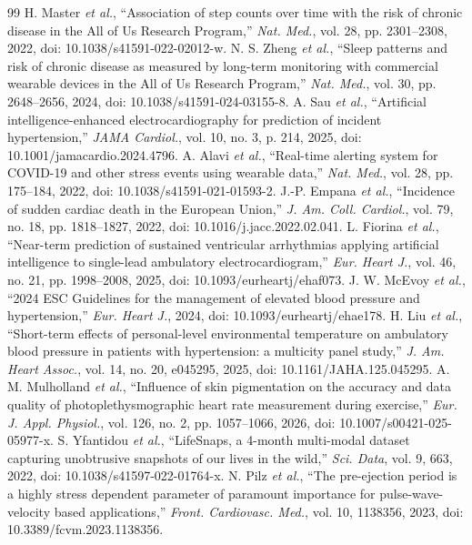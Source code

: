 \documentclass[conference]{IEEEtran}
\begin{document}
\begin{thebibliography}{99}
 H. Master \emph{et al.}, ``Association of step counts over time with the risk of chronic disease in the All of Us Research Program,'' \emph{Nat. Med.}, vol. 28, pp. 2301--2308, 2022, doi: 10.1038/s41591-022-02012-w.
 N. S. Zheng \emph{et al.}, ``Sleep patterns and risk of chronic disease as measured by long-term monitoring with commercial wearable devices in the All of Us Research Program,'' \emph{Nat. Med.}, vol. 30, pp. 2648--2656, 2024, doi: 10.1038/s41591-024-03155-8.
 A. Sau \emph{et al.}, ``Artificial intelligence-enhanced electrocardiography for prediction of incident hypertension,'' \emph{JAMA Cardiol.}, vol. 10, no. 3, p. 214, 2025, doi: 10.1001/jamacardio.2024.4796.
 A. Alavi \emph{et al.}, ``Real-time alerting system for COVID-19 and other stress events using wearable data,'' \emph{Nat. Med.}, vol. 28, pp. 175--184, 2022, doi: 10.1038/s41591-021-01593-2.
 J.-P. Empana \emph{et al.}, ``Incidence of sudden cardiac death in the European Union,'' \emph{J. Am. Coll. Cardiol.}, vol. 79, no. 18, pp. 1818--1827, 2022, doi: 10.1016/j.jacc.2022.02.041.
 L. Fiorina \emph{et al.}, ``Near-term prediction of sustained ventricular arrhythmias applying artificial intelligence to single-lead ambulatory electrocardiogram,'' \emph{Eur. Heart J.}, vol. 46, no. 21, pp. 1998--2008, 2025, doi: 10.1093/eurheartj/ehaf073.
 J. W. McEvoy \emph{et al.}, ``2024 ESC Guidelines for the management of elevated blood pressure and hypertension,'' \emph{Eur. Heart J.}, 2024, doi: 10.1093/eurheartj/ehae178.
 H. Liu \emph{et al.}, ``Short-term effects of personal-level environmental temperature on ambulatory blood pressure in patients with hypertension: a multicity panel study,'' \emph{J. Am. Heart Assoc.}, vol. 14, no. 20, e045295, 2025, doi: 10.1161/JAHA.125.045295.
 A. M. Mulholland \emph{et al.}, ``Influence of skin pigmentation on the accuracy and data quality of photoplethysmographic heart rate measurement during exercise,'' \emph{Eur. J. Appl. Physiol.}, vol. 126, no. 2, pp. 1057--1066, 2026, doi: 10.1007/s00421-025-05977-x.
 S. Yfantidou \emph{et al.}, ``LifeSnaps, a 4-month multi-modal dataset capturing unobtrusive snapshots of our lives in the wild,'' \emph{Sci. Data}, vol. 9, 663, 2022, doi: 10.1038/s41597-022-01764-x.
 N. Pilz \emph{et al.}, ``The pre-ejection period is a highly stress dependent parameter of paramount importance for pulse-wave-velocity based applications,'' \emph{Front. Cardiovasc. Med.}, vol. 10, 1138356, 2023, doi: 10.3389/fcvm.2023.1138356.

\end{thebibliography}
\end{document}
